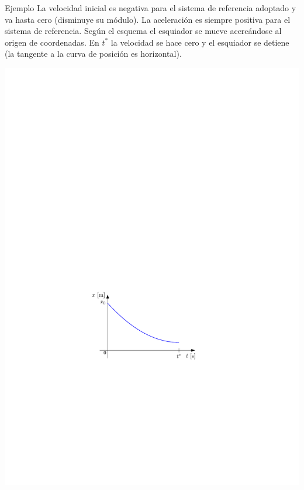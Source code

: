 \begin{example}{Ejemplo}
La velocidad inicial es negativa para el sistema de referencia adoptado y va hasta cero (disminuye su módulo). La aceleración es siempre positiva para el sistema de referencia. Según el esquema el esquiador se mueve acercándose al origen de coordenadas. En $t^*$ la velocidad se hace cero y el esquiador se detiene (la tangente a la curva de posición es horizontal).

  \begin{center}
    \includegraphics[]{img/plot2a.pdf}
    

\end{center}
\end{example}
